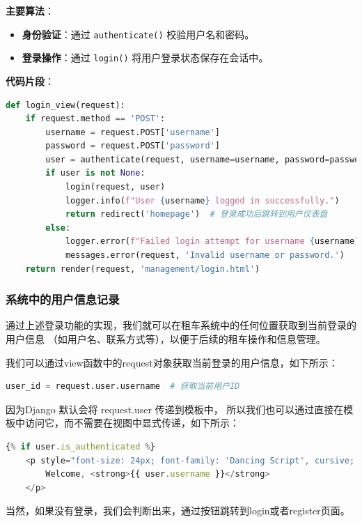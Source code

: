 \documentclass[UTF8,a4paper,12pt]{ctexart}
\begin{document}
\textbf{主要算法}：
\begin{itemize}
    \item \textbf{身份验证}：通过 \texttt{authenticate()} 校验用户名和密码。
    \item \textbf{登录操作}：通过 \texttt{login()} 将用户登录状态保存在会话中。
\end{itemize}

\textbf{代码片段}：
\begin{lstlisting}[language=Python]
def login_view(request):
    if request.method == 'POST':
        username = request.POST['username']
        password = request.POST['password']
        user = authenticate(request, username=username, password=password)
        if user is not None:
            login(request, user)
            logger.info(f"User {username} logged in successfully.")
            return redirect('homepage')  # 登录成功后跳转到用户仪表盘
        else:
            logger.error(f"Failed login attempt for username {username}.")
            messages.error(request, 'Invalid username or password.')
    return render(request, 'management/login.html')
\end{lstlisting}

\subsubsection{系统中的用户信息记录}

通过上述登录功能的实现，我们就可以在租车系统中的任何位置获取到当前登录的用户信息
（如用户名、联系方式等），以便于后续的租车操作和信息管理。

我们可以通过view函数中的request对象获取当前登录的用户信息，如下所示：

\begin{lstlisting}[language=Python]
    user_id = request.user.username  # 获取当前用户ID
\end{lstlisting}

因为Django 默认会将 request.user 传递到模板中，
所以我们也可以通过直接在模板中访问它，而不需要在视图中显式传递，如下所示：

\begin{lstlisting}[language=JavaScript]
    {% if user.is_authenticated %}
    <p style="font-size: 24px; font-family: 'Dancing Script', cursive; color: #7b1efc; font-weight: bold;">
        Welcome, <strong>{{ user.username }}</strong>
    </p>
\end{lstlisting}

当然，如果没有登录，我们会判断出来，通过按钮跳转到login或者register页面。
\end{document}
